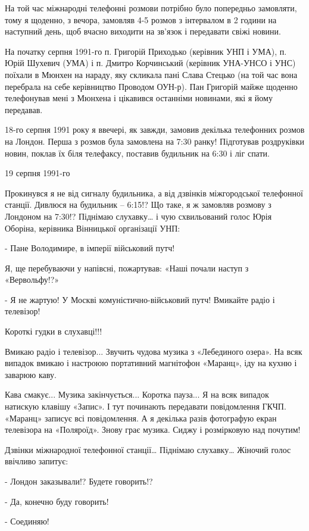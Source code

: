 На той час міжнародні телефонні розмови потрібно було попередньо замовляти,
тому я щоденно, з вечора, замовляв 4-5 розмов з інтервалом в 2 години на
наступний день, щоб вчасно виходити на зв’язок і передавати свіжі новини.

На початку серпня 1991-го п. Григорій Приходько (керівник УНП і УМА), п. Юрій
Шухевич (УМА) і п. Дмитро Корчинський (керівник УНА-УНСО і УНС) поїхали в
Мюнхен на нараду, яку скликала пані Слава Стецько (на той час вона перебрала на
себе керівництво Проводом ОУН-р). Пан Григорій майже щоденно телефонував мені з
Мюнхена і цікавився останніми новинами, які я йому передавав.

18-го серпня 1991 року я ввечері, як завжди, замовив декілька телефонних розмов
на Лондон. Перша з розмов була замовлена на 7:30 ранку! Підготував роздруківки
новин, поклав їх біля телефаксу, поставив будильник на 6:30 і ліг спати.

19 серпня 1991-го 

Прокинувся я не від сигналу будильника, а від дзвінків міжгородської телефонної
станції. Дивлюся на будильник – 6:15!? Що таке, я ж замовляв розмову з Лондоном
на 7:30!? Піднімаю слухавку… і чую схвильований голос Юрія Оборіна, керівника
Вінницької організації УНП: 

- Пане Володимире, в імперії військовий путч!

Я, ще перебуваючи у напівсні, пожартував: «Наші почали наступ з «Вервольфу!?» 

- Я не жартую! У Москві комуністично-військовий путч! Вмикайте радіо і
телевізор!

Короткі гудки в слухавці!!!

Вмикаю радіо і телевізор... Звучить чудова музика з «Лебединого озера». На всяк
випадок вмикаю і настроюю портативний магнітофон «Маранц», іду на кухню і
заварюю каву.

Кава смакує... Музика закінчується... Коротка пауза... Я на всяк випадок натискую
клавішу «Запис». І тут починають передавати повідомлення ГКЧП. «Маранц» записує
всі повідомлення. А я декілька разів фотографую екран телевізора на «Поляроїд».
Знову грає музика. Сиджу і розмірковую над почутим!

Дзвінки міжнародної телефонної станції… Піднімаю слухавку… Жіночий голос
ввічливо запитує: 

- Лондон заказывали!? Будете говорить!?

- Да, конечно буду говорить!

- Соединяю!

